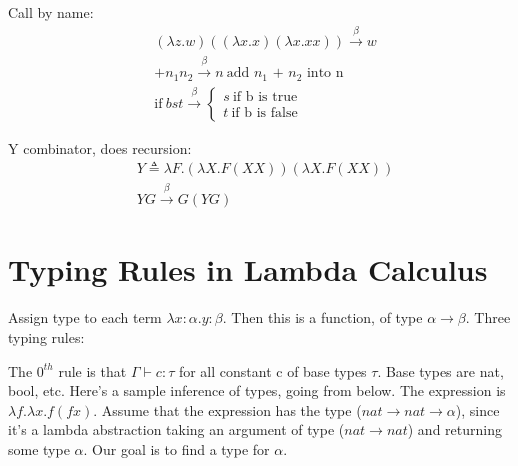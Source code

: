 \documentclass{article}
\newcommand{\asdef}{\triangleq}
\begin{document}
Call by name:
\begin{align*}
    & (\lambda z.w)((\lambda x.x)(\lambda x.xx)) \xrightarrow{\beta} w \\
    & + n_1 n_2 \xrightarrow{\beta} n\ \text{add $n_1$ + $n_2$ into n} \\
    & \text{if}\ bst \xrightarrow{\beta} \begin{cases}
         s\ \text{if b is true} \\
         t\ \text{if b is false}
    \end{cases}
\end{align*}

Y combinator, does recursion:
\begin{align*}
    & Y \asdef \lambda F.(\lambda X.F(XX)) (\lambda X.F(XX)) \\
    & YG \xrightarrow{\beta} G(YG)
\end{align*}

\section{Typing Rules in Lambda Calculus}
Assign type to each term $\lambda x:\alpha. y:\beta$. Then this is a function, of type $\alpha \rightarrow \beta$. Three typing rules:

\begin{prooftree}
\end{prooftree}

\begin{prooftree}
\end{prooftree}

\begin{prooftree}
\end{prooftree}

The $0^{th}$ rule is that $\Gamma \vdash c:\tau$ for all constant c of base types $\tau$. Base types are nat, bool, etc.
\vskip 0.1in
Here's a sample inference of types, going from below. The expression is $\lambda f. \lambda x.f(fx)$.
Assume that the expression has the type ($nat \to nat \to \alpha$), since it's a lambda abstraction
taking an argument of type ($nat \to nat$) and returning some type $\alpha$. Our goal is to find a
type for $\alpha$. 
\end{document}
